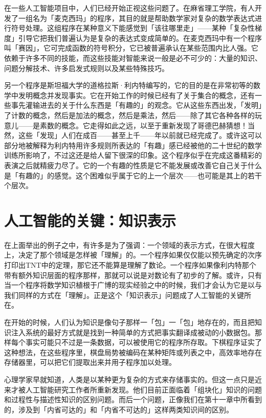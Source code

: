 \documentclass[
  12pt,
  twoside,
  openright,
  oldfontcommands,
]{memoir}
\begin{document}
在一些人工智能项目中，人们已经开始正视这些问题了。在麻省理工学院，有人开发了一组名为「麦克西玛」的程序，其目的就是帮助数学家对复杂的数学表达式进行符号处理。这组程序在某种意义下能感觉到「该往哪里走」------某种「复杂性梯度」引导它把我们普遍认为是复杂的表达式变成简单的。在麦克西玛中有一个程序叫「赛因」，它可完成函数的符号积分，它已被普遍承认在某些范围内比人强。它依赖于许多不同的技能，而这些技能对智能来说一般是必不可少的：大量的知识、问题分解技术、许多启发式规则以及某些特殊技巧。

另一个程序是斯坦福大学的道格拉斯·利内特编写的，它的目的是在非常初等的数学中发明概念并发现事实。它在开始工作的时候已经有了关于集合的概念，还有一些事先灌输进去的关于什么东西是「有趣的」的观念。它从这些东西出发，「发明」了计数的概念，然后是加法的概念，然后是乘法，然后------除了其它各种各样的玩意儿------是素数的概念。它走得如此之远，以至于重新发现了哥德巴赫猜想！当然，这些「发现」人们在成百------甚至上千------年以前就已经完成了。或许这可以部分地被解释为利内特用许多规则所表达的「有趣」感已经被他的二十世纪的数学训练所影响了，不过这还是给人留下很深的印象。这个程序似乎在完成这番精彩的表演之后就精疲力尽了。它的一个有趣的性质是它不能发展或改善它自己关于什么是「有趣的」的感觉。这个困难似乎属于它的上一个层次------也可能是其上的若干个层次。

\section{人工智能的关键：知识表示}

在上面举出的例子之中，有许多是为了强调：一个领域的表示方式，在很大程度上，决定了那个领域是怎样被「理解」的。一个程序如果仅仅能以预先确定的次序打印出TNT中的定理，那它还不能算是理解了数论。一个程序如果像利内特那个带有额外知识层面的程序那样，那就可以说是对数论有了初步的了解。或许，只有当一个程序将数学知识植根于广博的现实经验之中的时候，我们才会认为它是以与我们同样的方式在「理解」。正是这个「知识表示」问题成了人工智能的关键所在。

在开始的时候，人们认为知识是像句子那样一「包」一「包」地存在的，而且把知识注入系统的最好方式就是找到一种简单的方式把事实翻译成被动的小数据包。那样每个事实可能只不过是一条数据，可以被使用它的程序所存取。下棋程序证实了这种想法，在这些程序里，棋盘局势被编码在某种矩阵或列表之中，高效率地存在存储器里，可以把它们提取出来并用子程序加以处理。

心理学家早就知道，人类是以某种更为复杂的方式来存储事实的。但这一点只是近来才被人工智能研究工作者所重新发现。他们目前正面临着「组块化」知识的问题和过程性与描述性知识的区别问题。而后一个问题，正像我们在第十一章中所看到的，涉及到「内省可达的」和「内省不可达的」这样两类知识间的区别。
\end{document}

